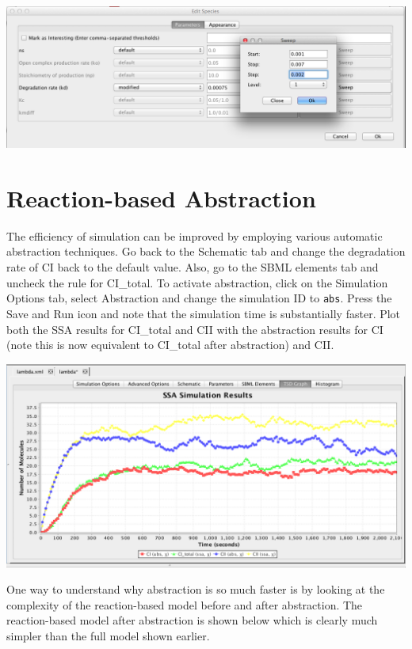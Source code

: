 \documentclass[titlepage,11pt]{article}
\begin{document}
\begin{center}
\includegraphics[width=160mm]{screenshots/sweep}
\end{center}

\section{Reaction-based Abstraction}

The efficiency of simulation can be improved by employing various automatic abstraction techniques.  Go back to the Schematic tab and change the degradation rate of CI back to the default value.  Also, go to the SBML elements tab and uncheck the rule for CI\_total.  To activate abstraction, click on the Simulation Options tab, select Abstraction and change the simulation ID to {\tt abs}.  Press the Save and Run icon and note that the simulation time is substantially faster.  Plot both the SSA results for CI\_total and CII with the abstraction results for CI (note this is now equivalent to CI\_total after abstraction) and CII.

\begin{center}
\includegraphics[width=160mm]{screenshots/absResults}
\end{center}

One way to understand why abstraction is so much faster is by looking at the complexity of the reaction-based model before and after abstraction.  The reaction-based model after abstraction is shown below which is clearly much simpler than the full model shown earlier.
\end{document}
